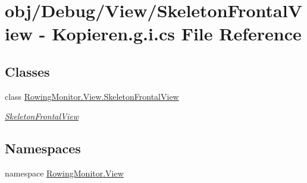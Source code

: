 \hypertarget{_skeleton_frontal_view_01-_01_kopieren_8g_8i_8cs}{}\section{obj/\+Debug/\+View/\+Skeleton\+Frontal\+View -\/ Kopieren.\+g.\+i.\+cs File Reference}
\label{_skeleton_frontal_view_01-_01_kopieren_8g_8i_8cs}
\subsection*{Classes}
\begin{DoxyCompactItemize}
\item 
class \hyperlink{class_rowing_monitor_1_1_view_1_1_skeleton_frontal_view}{Rowing\+Monitor.\+View.\+Skeleton\+Frontal\+View}
\begin{DoxyCompactList}\small\item\em \hyperlink{class_rowing_monitor_1_1_view_1_1_skeleton_frontal_view}{Skeleton\+Frontal\+View} \end{DoxyCompactList}\end{DoxyCompactItemize}
\subsection*{Namespaces}
\begin{DoxyCompactItemize}
\item 
namespace \hyperlink{namespace_rowing_monitor_1_1_view}{Rowing\+Monitor.\+View}
\end{DoxyCompactItemize}
